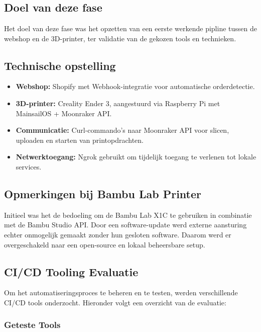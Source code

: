 \chapter{}%
\label{ch:poc}

\section{Doel van deze fase}
Het doel van deze fase was het opzetten van een eerste werkende pipline tussen de webshop en de 3D-printer, ter validatie van de gekozen tools en technieken.

\section{Technische opstelling}
\begin{itemize}
    \item \textbf{Webshop:} Shopify met Webhook-integratie voor automatische orderdetectie.
    \item \textbf{3D-printer:} Creality Ender 3, aangestuurd via Raspberry Pi met MainsailOS + Moonraker API.
    \item \textbf{Communicatie:} Curl-commando’s naar Moonraker API voor slicen, uploaden en starten van printopdrachten.
    \item \textbf{Netwerktoegang:} Ngrok gebruikt om tijdelijk toegang te verlenen tot lokale services.
\end{itemize}

\section{Opmerkingen bij Bambu Lab Printer}
Initieel was het de bedoeling om de Bambu Lab X1C te gebruiken in combinatie met de Bambu Studio API. Door een software-update werd externe aansturing echter onmogelijk gemaakt zonder hun gesloten software. Daarom werd er overgeschakeld naar een open-source en lokaal beheersbare setup.

\section{CI/CD Tooling Evaluatie}
Om het automatiseringsproces te beheren en te testen, werden verschillende CI/CD tools onderzocht. Hieronder volgt een overzicht van de evaluatie:

\subsection{Geteste Tools}

